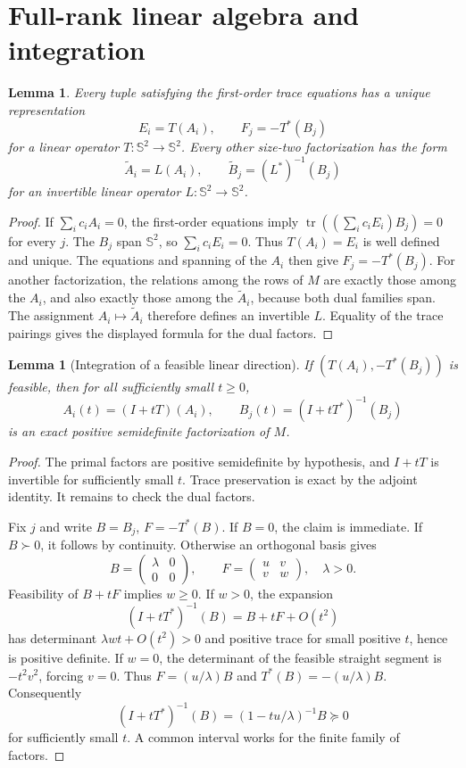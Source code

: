 \documentclass[11pt]{article}
\newtheorem{lemma}[theorem]{Lemma}
\newcommand{\Sym}{\mathbb S^2}
\newcommand{\tr}{\operatorname{tr}}
\begin{document}
\section{Full-rank linear algebra and integration}
\begin{lemma}\label{lem:operator}
Every tuple satisfying the first-order trace equations has a unique representation
\[
 E_i=T(A_i),\qquad F_j=-T^*(B_j)
\]
for a linear operator $T:\Sym\to\Sym$.
Every other size-two factorization has the form
\[
 \widetilde A_i=L(A_i),\qquad
 \widetilde B_j=(L^*)^{-1}(B_j)
\]
for an invertible linear operator $L:\Sym\to\Sym$.
\end{lemma}
\begin{proof}
If $\sum_i c_i A_i=0$, the first-order equations imply
$\tr((\sum_i c_iE_i)B_j)=0$ for every $j$. The $B_j$ span $\Sym$, so $\sum_i c_iE_i=0$. Thus $T(A_i)=E_i$ is well defined and unique. The equations and spanning of the $A_i$ then give $F_j=-T^*(B_j)$.
For another factorization, the relations among the rows of $M$ are exactly those among the $A_i$, and also exactly those among the $\widetilde A_i$, because both dual families span. The assignment $A_i\mapsto\widetilde A_i$ therefore defines an invertible $L$. Equality of the trace pairings gives the displayed formula for the dual factors.
\end{proof}

\begin{lemma}[Integration of a feasible linear direction]\label{lem:integrate}
If $(T(A_i),-T^*(B_j))$ is feasible, then for all sufficiently small $t\geq0$,
\[
 A_i(t)=(I+tT)(A_i),\qquad
 B_j(t)=(I+tT^*)^{-1}(B_j)
\]
is an exact positive semidefinite factorization of $M$.
\end{lemma}
\begin{proof}
The primal factors are positive semidefinite by hypothesis, and $I+tT$ is invertible for sufficiently small $t$. Trace preservation is exact by the adjoint identity. It remains to check the dual factors.

Fix $j$ and write $B=B_j$, $F=-T^*(B)$. If $B=0$, the claim is immediate. If $B\succ0$, it follows by continuity. Otherwise an orthogonal basis gives
\[
 B=\begin{pmatrix}\lambda&0\\0&0\end{pmatrix},\qquad
 F=\begin{pmatrix}u&v\\v&w\end{pmatrix},\quad \lambda>0.
\]
Feasibility of $B+tF$ implies $w\geq0$. If $w>0$, the expansion
\[
 (I+tT^*)^{-1}(B)=B+tF+O(t^2)
\]
has determinant $\lambda wt+O(t^2)>0$ and positive trace for small positive $t$, hence is positive definite. If $w=0$, the determinant of the feasible straight segment is $-t^2v^2$, forcing $v=0$. Thus $F=(u/\lambda)B$ and $T^*(B)=-(u/\lambda)B$. Consequently
\[
 (I+tT^*)^{-1}(B)=(1-tu/\lambda)^{-1}B\succeq0
\]
for sufficiently small $t$. A common interval works for the finite family of factors.
\end{proof}
\end{document}
